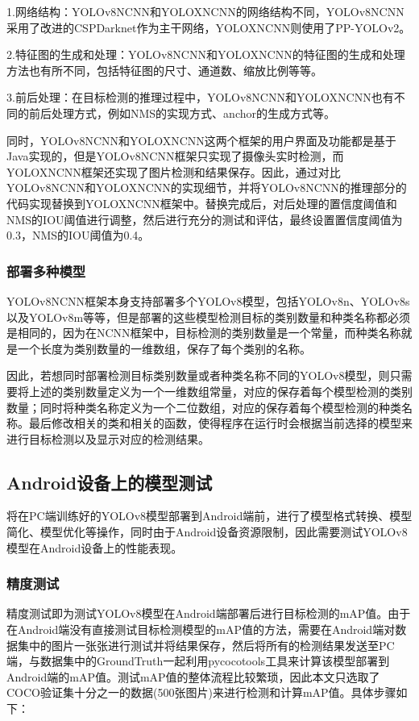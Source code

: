 \documentclass{ctexart}
\numberwithin{equation}{section}%
\numberwithin{figure}{section}%
\numberwithin{table}{section}%
\begin{document}
	1.网络结构：YOLOv8NCNN和YOLOXNCNN的网络结构不同，YOLOv8NCNN采用了改进的CSPDarknet作为主干网络，YOLOXNCNN则使用了PP-YOLOv2。
	
	2.特征图的生成和处理：YOLOv8NCNN和YOLOXNCNN的特征图的生成和处理方法也有所不同，包括特征图的尺寸、通道数、缩放比例等等。
	
	3.前后处理：在目标检测的推理过程中，YOLOv8NCNN和YOLOXNCNN也有不同的前后处理方式，例如NMS的实现方式、anchor的生成方式等。
	
	同时，YOLOv8NCNN和YOLOXNCNN这两个框架的用户界面及功能都是基于Java实现的，但是YOLOv8NCNN框架只实现了摄像头实时检测，而YOLOXNCNN框架还实现了图片检测和结果保存。因此，通过对比YOLOv8NCNN和YOLOXNCNN的实现细节，并将YOLOv8NCNN的推理部分的代码实现替换到YOLOXNCNN框架中。替换完成后，对后处理的置信度阈值和NMS的IOU阈值进行调整，然后进行充分的测试和评估，最终设置置信度阈值为0.3，NMS的IOU阈值为0.4。
	
	\subsubsection{部署多种模型}
	YOLOv8NCNN框架本身支持部署多个YOLOv8模型，包括YOLOv8n、YOLOv8s以及YOLOv8m等等，但是部署的这些模型检测目标的类别数量和种类名称都必须是相同的，因为在NCNN框架中，目标检测的类别数量是一个常量，而种类名称就是一个长度为类别数量的一维数组，保存了每个类别的名称。
	
	因此，若想同时部署检测目标类别数量或者种类名称不同的YOLOv8模型，则只需要将上述的类别数量定义为一个一维数组常量，对应的保存着每个模型检测的类别数量；同时将种类名称定义为一个二位数组，对应的保存着每个模型检测的种类名称。最后修改相关的类和相关的函数，使得程序在运行时会根据当前选择的模型来进行目标检测以及显示对应的检测结果。
	
	\subsection{Android设备上的模型测试}
	将在PC端训练好的YOLOv8模型部署到Android端前，进行了模型格式转换、模型简化、模型优化等操作，同时由于Android设备资源限制，因此需要测试YOLOv8模型在Android设备上的性能表现。
	
	\subsubsection{精度测试}
	精度测试即为测试YOLOv8模型在Android端部署后进行目标检测的mAP值。由于在Android端没有直接测试目标检测模型的mAP值的方法，需要在Android端对数据集中的图片一张张进行测试并将结果保存，然后将所有的检测结果发送至PC端，与数据集中的GroundTruth一起利用pycocotools工具来计算该模型部署到Android端的mAP值。测试mAP值的整体流程比较繁琐，因此本文只选取了COCO验证集十分之一的数据(500张图片)来进行检测和计算mAP值。具体步骤如下：
	
\end{document}
